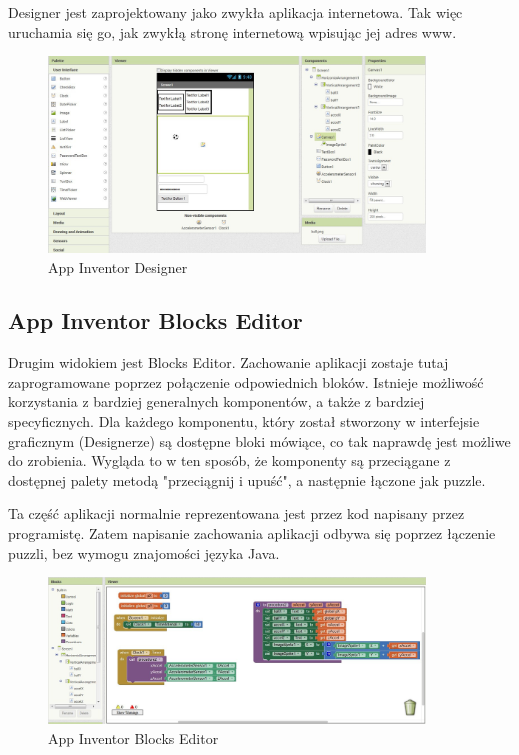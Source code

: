 Designer jest zaprojektowany jako zwykła aplikacja internetowa. Tak więc uruchamia się go, jak zwykłą stronę internetową wpisując jej adres www.

\begin{figure}[th] 
\centering\includegraphics[width=10cm]{figures/designer}
\caption{App Inventor Designer}
\end{figure}

\subsection{App Inventor Blocks Editor}
\label{c222}

Drugim widokiem jest Blocks Editor. Zachowanie aplikacji zostaje tutaj zaprogramowane poprzez połączenie odpowiednich bloków. Istnieje możliwość korzystania z bardziej generalnych komponentów, a także z bardziej specyficznych. Dla każdego komponentu, który został stworzony w interfejsie graficznym (Designerze) są dostępne bloki mówiące, co tak naprawdę jest możliwe do zrobienia. Wygląda to w ten sposób, że komponenty są przeciągane z dostępnej palety metodą "przeciągnij i upuść", a następnie łączone jak puzzle.

Ta część aplikacji normalnie reprezentowana jest przez kod napisany przez programistę. Zatem napisanie zachowania aplikacji odbywa się poprzez łączenie puzzli, bez wymogu znajomości języka Java.

\begin{figure}[H] 
\centering\includegraphics[width=10cm]{figures/editor}
\caption{App Inventor Blocks Editor}
\end{figure}

